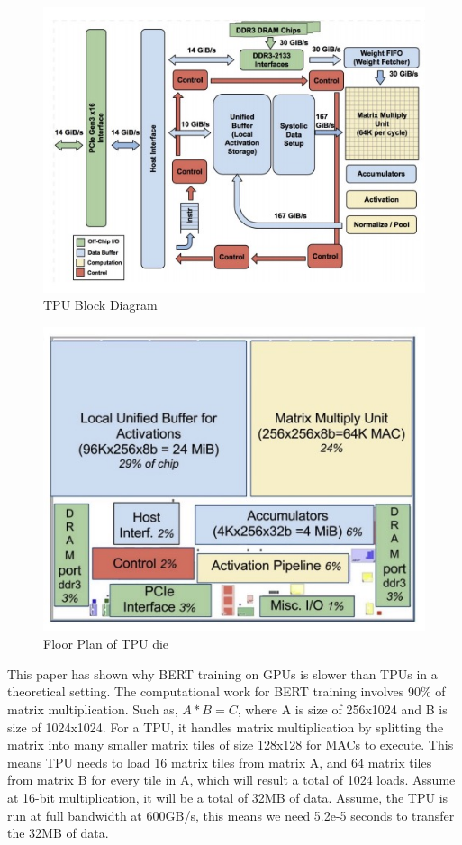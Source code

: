 \documentclass[conference]{IEEEtran}
\begin{document}
	\begin{figure}[!htbp]
		\centering
		\includegraphics[scale=0.5]{figures/figure10.png}
		\caption{\label{fig:my-label}TPU Block Diagram \cite{TPUpaper}}
	\end{figure}
	
	\begin{figure}[!htbp]
		\centering
		\includegraphics[scale=0.5]{figures/figure11.png}
		\caption{\label{fig:my-label} Floor Plan of TPU die \cite{TPUpaper}}
	\end{figure}
	
	This paper \cite{tpubert} has shown why BERT training on GPUs is slower than TPUs in a theoretical setting. The computational work for BERT training involves 90\% of matrix multiplication. Such as, \(A*B = C\), where A is size of 256x1024 and B is size of 1024x1024. For a TPU, it handles matrix multiplication by splitting the matrix into many smaller matrix tiles of size 128x128 for MACs to execute. This means TPU needs to load 16 matrix tiles from matrix A, and 64 matrix tiles from matrix B for every tile in A, which will result a total of 1024 loads. Assume at 16-bit multiplication, it will be a total of 32MB of data. Assume, the TPU is run at full bandwidth at 600GB/s, this means we need 5.2e-5 seconds to transfer the 32MB of data.\\
	
\end{document}
